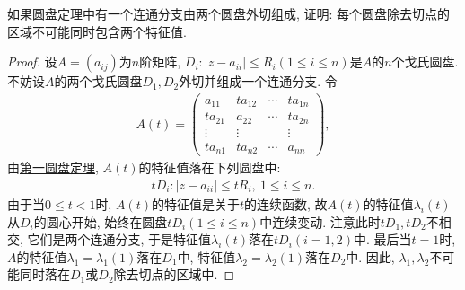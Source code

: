 \documentclass[../../main.tex]{subfiles}%
\begin{document}
\begin{example}
如果圆盘定理中有一个连通分支由两个圆盘外切组成, 证明: 每个圆盘除去切点的区域不可能同时包含两个特征值.
\end{example}
\begin{proof}
设\(A = (a_{ij})\)为\(n\)阶矩阵, \(D_{i}:|z - a_{ii}| \leqslant  R_{i}(1 \leqslant  i \leqslant  n)\)是\(A\)的\(n\)个戈氏圆盘. 不妨设\(A\)的两个戈氏圆盘\(D_{1},D_{2}\)外切并组成一个连通分支. 令
\begin{align*}
A(t)= 
\begin{pmatrix}
a_{11} & ta_{12} & \cdots & ta_{1n}\\
ta_{21} & a_{22} & \cdots & ta_{2n}\\
\vdots & \vdots & & \vdots\\
ta_{n1} & ta_{n2} & \cdots & a_{nn}
\end{pmatrix},
\end{align*}
由\hyperref[theorem:第一圆盘定理]{第一圆盘定理}, \(A(t)\)的特征值落在下列圆盘中:
\begin{align*}
tD_{i}:|z - a_{ii}| \leqslant  tR_{i},\ 1 \leqslant  i \leqslant  n.
\end{align*}
由于当\(0 \leqslant  t < 1\)时, \(A(t)\)的特征值是关于\(t\)的连续函数, 故\(A(t)\)的特征值\(\lambda_{i}(t)\)从\(D_{i}\)的圆心开始, 始终在圆盘\(tD_{i}(1 \leqslant  i \leqslant  n)\)中连续变动. 注意此时\(tD_{1},tD_{2}\)不相交, 它们是两个连通分支, 于是特征值\(\lambda_{i}(t)\)落在\(tD_{i}(i = 1,2)\)中. 最后当\(t = 1\)时, \(A\)的特征值\(\lambda_{1}=\lambda_{1}(1)\)落在\(D_{1}\)中, 特征值\(\lambda_{2}=\lambda_{2}(1)\)落在\(D_{2}\)中. 因此, \(\lambda_{1},\lambda_{2}\)不可能同时落在\(D_{1}\)或\(D_{2}\)除去切点的区域中.
\end{proof}
\end{document}
